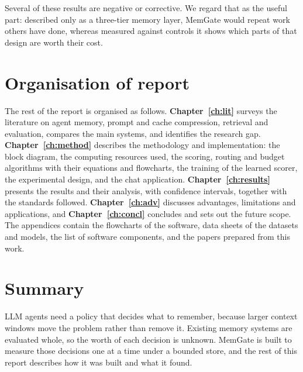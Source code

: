 Several of these results are negative or corrective. We regard that as the
useful part: described only as a three-tier memory layer, MemGate would repeat
work others have done, whereas measured against controls it shows which parts
of that design are worth their cost.

\section{Organisation of report}

The rest of the report is organised as follows.
\textbf{Chapter~\ref{ch:lit}} surveys the literature on agent memory, prompt
and cache compression, retrieval and evaluation, compares the main systems,
and identifies the research gap.
\textbf{Chapter~\ref{ch:method}} describes the methodology and implementation:
the block diagram, the computing resources used, the scoring, routing and
budget algorithms with their equations and flowcharts, the training of the
learned scorer, the experimental design, and the chat application.
\textbf{Chapter~\ref{ch:results}} presents the results and their analysis,
with confidence intervals, together with the standards followed.
\textbf{Chapter~\ref{ch:adv}} discusses advantages, limitations and
applications, and \textbf{Chapter~\ref{ch:concl}} concludes and sets out the
future scope. The appendices contain the flowcharts of the software, data
sheets of the datasets and models, the list of software components, and the
papers prepared from this work.

\section*{Summary}
LLM agents need a policy that decides what to remember, because larger
context windows move the problem rather than remove it. Existing memory
systems are evaluated whole, so the worth of each decision is unknown. MemGate
is built to measure those decisions one at a time under a bounded store, and
the rest of this report describes how it was built and what it found.
